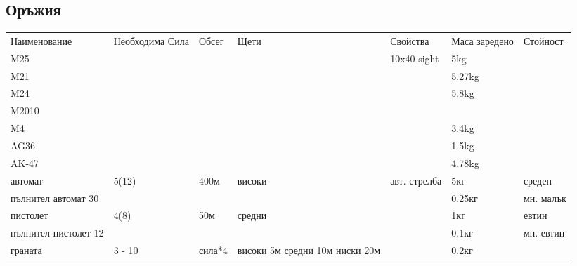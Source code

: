 \subsection{Оръжия}
\begin{tabular}{p{2cm} | p{2cm} | p{2cm} | p{2cm} | p{2cm} | p{2cm} | p{2cm}}
Наименование          & Необходима Сила      & Обсег      & Щети       & Свойства       & Маса заредено & Стойност         \\
M25                   &                      &            &            & 10x40 sight    & 5kg           &                  \\  %
M21                   &                      &            &            &                & 5.27kg        &                  \\  %
M24                   &                      &            &            &                & 5.8kg         &                  \\  %
M2010                 &                      &            &            &                &               &                  \\
M4                    &                      &            &            &                & 3.4kg         &                  \\  %
AG36                  &                      &            &            &                & 1.5kg         &                  \\  %
AK-47                 &                      &            &            &                & 4.78kg        &                  \\  %
%
автомат               & 5(12)                & 400м       & високи     & авт. стрелба   & 5кг           & среден           \\
пълнител автомат 30   &                      &            &            &                & 0.25кг        & мн. малък        \\
пистолет              & 4(8)                 & 50м        & средни     &                & 1кг           & евтин            \\
пълнител пистолет 12  &                      &            &            &                & 0.1кг         & мн. евтин        \\
граната               & 3 - 10               & сила*4     & високи 5м средни 10м ниски 20м & & 0.2кг    &                  \\

\end{tabular}

